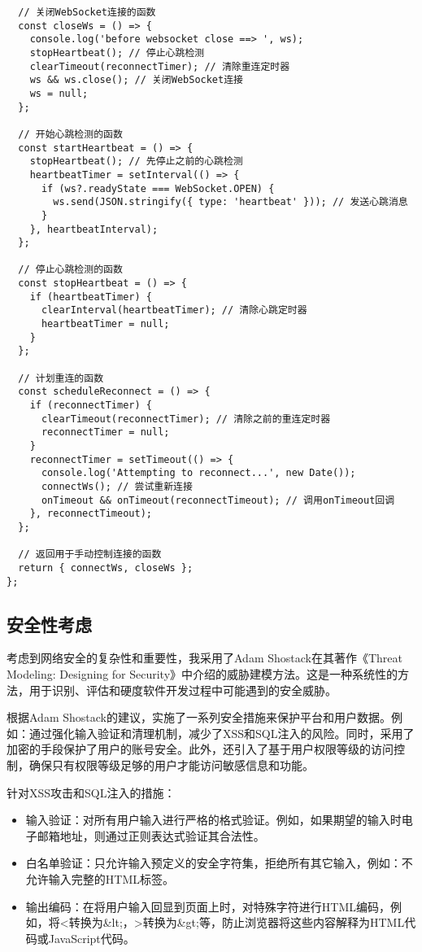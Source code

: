 \documentclass[12pt,a4paper]{article}
\begin{document}
\begin{CJK*}{UTF8}{gbsn}
\begin{mdframed}
\begin{verbatim}
  // 关闭WebSocket连接的函数
  const closeWs = () => {
    console.log('before websocket close ==> ', ws);
    stopHeartbeat(); // 停止心跳检测
    clearTimeout(reconnectTimer); // 清除重连定时器
    ws && ws.close(); // 关闭WebSocket连接
    ws = null;
  };

  // 开始心跳检测的函数
  const startHeartbeat = () => {
    stopHeartbeat(); // 先停止之前的心跳检测
    heartbeatTimer = setInterval(() => {
      if (ws?.readyState === WebSocket.OPEN) {
        ws.send(JSON.stringify({ type: 'heartbeat' })); // 发送心跳消息
      }
    }, heartbeatInterval);
  };

  // 停止心跳检测的函数
  const stopHeartbeat = () => {
    if (heartbeatTimer) {
      clearInterval(heartbeatTimer); // 清除心跳定时器
      heartbeatTimer = null;
    }
  };

  // 计划重连的函数
  const scheduleReconnect = () => {
    if (reconnectTimer) {
      clearTimeout(reconnectTimer); // 清除之前的重连定时器
      reconnectTimer = null;
    }
    reconnectTimer = setTimeout(() => {
      console.log('Attempting to reconnect...', new Date());
      connectWs(); // 尝试重新连接
      onTimeout && onTimeout(reconnectTimeout); // 调用onTimeout回调
    }, reconnectTimeout);
  };

  // 返回用于手动控制连接的函数
  return { connectWs, closeWs };
};
\end{verbatim}
\end{mdframed}

\subsection{安全性考虑}
考虑到网络安全的复杂性和重要性，我采用了Adam Shostack在其著作《Threat Modeling: Designing for Security》中介绍的威胁建模方法。这是一种系统性的方法，用于识别、评估和硬度软件开发过程中可能遇到的安全威胁。

根据Adam Shostack的建议，实施了一系列安全措施来保护平台和用户数据。例如：通过强化输入验证和清理机制，减少了XSS和SQL注入的风险。同时，采用了加密的手段保护了用户的账号安全。此外，还引入了基于用户权限等级的访问控制，确保只有权限等级足够的用户才能访问敏感信息和功能。

针对XSS攻击和SQL注入的措施：
\begin{itemize}
    \item 输入验证：对所有用户输入进行严格的格式验证。例如，如果期望的输入时电子邮箱地址，则通过正则表达式验证其合法性。
    \item 白名单验证：只允许输入预定义的安全字符集，拒绝所有其它输入，例如：不允许输入完整的HTML标签。
    \item 输出编码：在将用户输入回显到页面上时，对特殊字符进行HTML编码，例如，将<转换为\&lt;，>转换为\&gt;等，防止浏览器将这些内容解释为HTML代码或JavaScript代码。
\end{itemize}


\end{CJK*}
\end{document}
